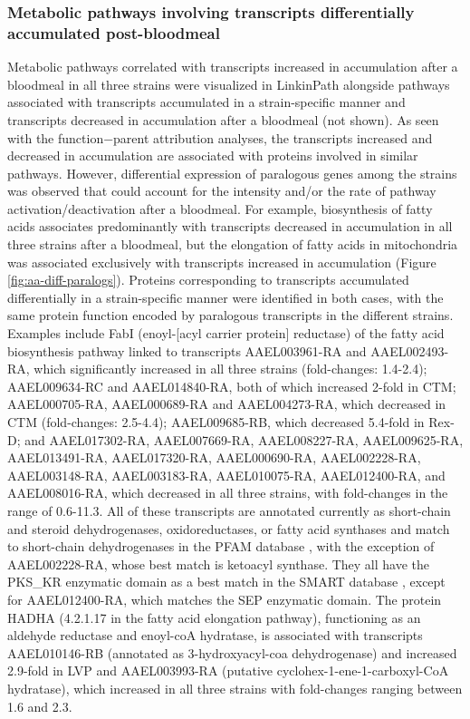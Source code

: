 \subsubsection{Metabolic pathways involving transcripts differentially accumulated post-bloodmeal}


Metabolic pathways correlated with transcripts increased in accumulation after a bloodmeal in all three strains were visualized in LinkinPath \cite{Ingsriswang2011} alongside pathways associated with transcripts accumulated in a strain-specific manner and transcripts decreased in accumulation after a bloodmeal (not shown).
As seen with the function−parent attribution analyses, the transcripts increased and decreased in accumulation are associated with proteins involved in similar pathways.
However, differential expression of paralogous genes among the strains was observed that could account for the intensity and/or the rate of pathway activation/deactivation after a bloodmeal.
For example, biosynthesis of fatty acids associates predominantly with transcripts decreased in accumulation in all three strains after a bloodmeal, but the elongation of fatty acids in mitochondria was associated 
exclusively with transcripts increased in accumulation (Figure \ref{fig:aa-diff-paralogs}).
Proteins corresponding to transcripts accumulated differentially in a strain-specific manner were identified in both cases, with the same protein function encoded by paralogous transcripts in the different strains.
Examples include FabI (enoyl-[acyl carrier protein] reductase) of the fatty acid biosynthesis pathway linked to transcripts AAEL003961-RA and AAEL002493-RA, which significantly increased in all three strains (fold-changes: 1.4-2.4); AAEL009634-RC and AAEL014840-RA, both of which increased 2-fold in \gls{CTM}; AAEL000705-RA, AAEL000689-RA and AAEL004273-RA, which decreased in \gls{CTM} (fold-changes: 2.5-4.4); AAEL009685-RB, which decreased 5.4-fold in \gls{Rex-D}; and AAEL017302-RA, AAEL007669-RA, AAEL008227-RA, AAEL009625-RA, AAEL013491-RA, AAEL017320-RA, AAEL000690-RA, AAEL002228-RA, AAEL003148-RA, AAEL003183-RA, AAEL010075-RA, AAEL012400-RA, and AAEL008016-RA, which decreased in all three strains, with fold-changes in the range of 0.6-11.3.
All of these transcripts are annotated currently as short-chain and steroid dehydrogenases, oxidoreductases, or fatty acid synthases \cite{Ribeiro-AegyXcel} and match to short-chain dehydrogenases in the PFAM database \cite{Finn2008}, with the exception of AAEL002228-RA, whose best match is ketoacyl synthase.
They all have the PKS\_KR enzymatic domain as a best match in the SMART database \cite{Letunic2009}, except for AAEL012400-RA, which matches the SEP enzymatic domain.
The protein HADHA (4.2.1.17 in the fatty acid elongation pathway), functioning as an aldehyde reductase and enoyl-coA hydratase, is associated with transcripts AAEL010146-RB (annotated as 3-hydroxyacyl-coa dehydrogenase) and increased 2.9-fold in \gls{LVP} and AAEL003993-RA (putative cyclohex-1-ene-1-carboxyl-CoA hydratase), which increased in all three strains with fold-changes ranging between 1.6 and 2.3.


